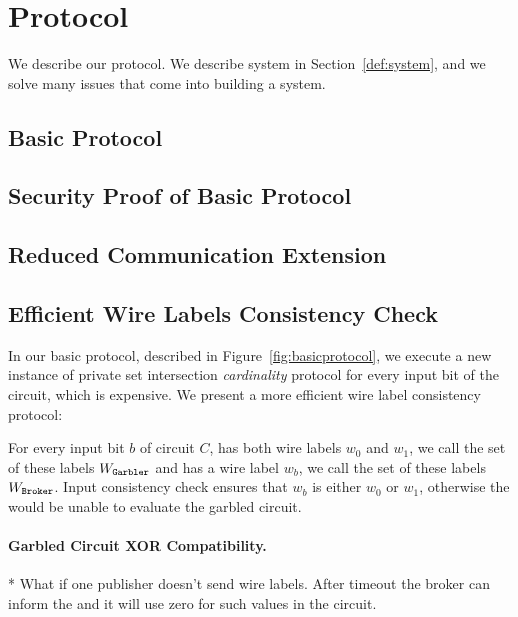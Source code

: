 \section{Protocol}
\label{sec:protocol}

We describe our protocol. We describe system in Section~\ref{def:system}, and
we solve many issues that come into building a system.


\subsection{Basic Protocol}


\subsection{Security Proof of Basic Protocol}


\subsection{Reduced Communication Extension}


\subsection{Efficient Wire Labels Consistency Check} In our basic
protocol, described in Figure~\ref{fig:basicprotocol}, we execute a new
instance of private set intersection \emph{cardinality} protocol for every
input bit of the circuit, which is expensive.  We present a more efficient wire
label consistency protocol:

For every input bit $b$ of circuit $C$, \garbler has both wire labels $w_0$ and
$w_1$, we call the set of these labels $W_\texttt{Garbler}$ and \broker has a wire
label $w_b$, we call the set of these labels $W_\texttt{Broker}$. Input consistency
check ensures that $w_b$ is either $w_0$ or $w_1$, otherwise the \broker would
be unable to evaluate the garbled circuit.




\paragraph{Garbled Circuit XOR Compatibility.}


* What if one publisher doesn't send wire labels. After timeout the broker can
inform the \garbler and it will use zero for such values in the circuit.

